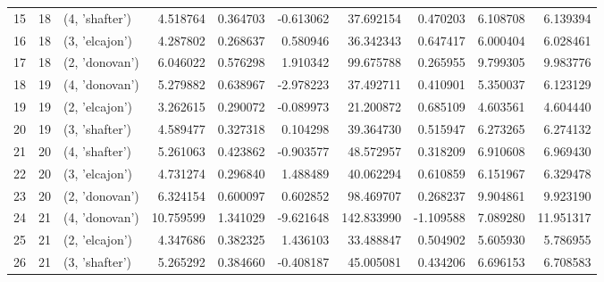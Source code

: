 \begin{tabular}{lrlrrrrrrr}
15 &     18 &  (4, 'shafter') &   4.518764 &   0.364703 & -0.613062 &   37.692154 &  0.470203 &   6.108708 &   6.139394 \\
16 &     18 &  (3, 'elcajon') &   4.287802 &   0.268637 &  0.580946 &   36.342343 &  0.647417 &   6.000404 &   6.028461 \\
17 &     18 &  (2, 'donovan') &   6.046022 &   0.576298 &  1.910342 &   99.675788 &  0.265955 &   9.799305 &   9.983776 \\
18 &     19 &  (4, 'donovan') &   5.279882 &   0.638967 & -2.978223 &   37.492711 &  0.410901 &   5.350037 &   6.123129 \\
19 &     19 &  (2, 'elcajon') &   3.262615 &   0.290072 & -0.089973 &   21.200872 &  0.685109 &   4.603561 &   4.604440 \\
20 &     19 &  (3, 'shafter') &   4.589477 &   0.327318 &  0.104298 &   39.364730 &  0.515947 &   6.273265 &   6.274132 \\
21 &     20 &  (4, 'shafter') &   5.261063 &   0.423862 & -0.903577 &   48.572957 &  0.318209 &   6.910608 &   6.969430 \\
22 &     20 &  (3, 'elcajon') &   4.731274 &   0.296840 &  1.488489 &   40.062294 &  0.610859 &   6.151967 &   6.329478 \\
23 &     20 &  (2, 'donovan') &   6.324154 &   0.600097 &  0.602852 &   98.469707 &  0.268237 &   9.904861 &   9.923190 \\
24 &     21 &  (4, 'donovan') &  10.759599 &   1.341029 & -9.621648 &  142.833990 & -1.109588 &   7.089280 &  11.951317 \\
25 &     21 &  (2, 'elcajon') &   4.347686 &   0.382325 &  1.436103 &   33.488847 &  0.504902 &   5.605930 &   5.786955 \\
26 &     21 &  (3, 'shafter') &   5.265292 &   0.384660 & -0.408187 &   45.005081 &  0.434206 &   6.696153 &   6.708583 \\
\bottomrule
\end{tabular}
